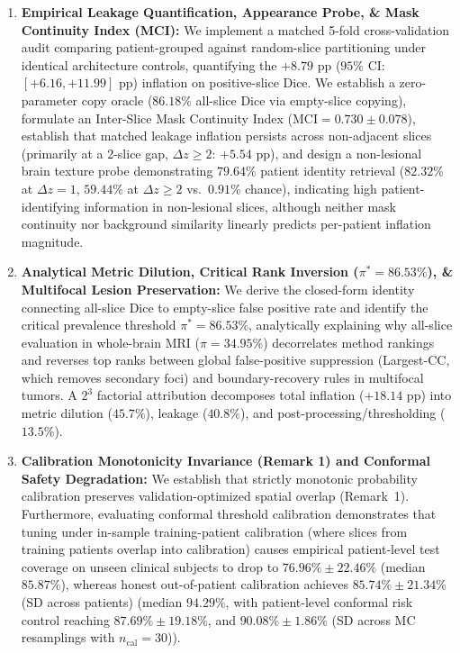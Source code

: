 \documentclass[11pt,a4paper]{article}
\begin{document}
\begin{enumerate}
    \item \textbf{Empirical Leakage Quantification, Appearance Probe, \& Mask Continuity Index (MCI):} We implement a matched 5-fold cross-validation audit comparing patient-grouped against random-slice partitioning under identical architecture controls, quantifying the $+8.79\text{ pp}$ ($95\%$ CI: $[+6.16, +11.99]\text{ pp}$) inflation on positive-slice Dice. We establish a zero-parameter copy oracle ($86.18\%$ all-slice Dice via empty-slice copying), formulate an Inter-Slice Mask Continuity Index ($\text{MCI} = 0.730 \pm 0.078$), establish that matched leakage inflation persists across non-adjacent slices (primarily at a 2-slice gap, $\Delta z \ge 2$: $+5.54\text{ pp}$), and design a non-lesional brain texture probe demonstrating $79.64\%$ patient identity retrieval ($82.32\%$ at $\Delta z = 1$, $59.44\%$ at $\Delta z \ge 2$ vs.\ $0.91\%$ chance), indicating high patient-identifying information in non-lesional slices, although neither mask continuity nor background similarity linearly predicts per-patient inflation magnitude.
    \item \textbf{Analytical Metric Dilution, Critical Rank Inversion ($\pi^* = 86.53\%$), \& Multifocal Lesion Preservation:} We derive the closed-form identity connecting all-slice Dice to empty-slice false positive rate and identify the critical prevalence threshold $\pi^* = 86.53\%$, analytically explaining why all-slice evaluation in whole-brain MRI ($\pi = 34.95\%$) decorrelates method rankings and reverses top ranks between global false-positive suppression (Largest-CC, which removes secondary foci) and boundary-recovery rules in multifocal tumors. A $2^3$ factorial attribution decomposes total inflation ($+18.14\text{ pp}$) into metric dilution ($45.7\%$), leakage ($40.8\%$), and post-processing/thresholding ($13.5\%$).
    \item \textbf{Calibration Monotonicity Invariance (Remark 1) and Conformal Safety Degradation:} We establish that strictly monotonic probability calibration preserves validation-optimized spatial overlap (Remark~1). Furthermore, evaluating conformal threshold calibration demonstrates that tuning under in-sample training-patient calibration (where slices from training patients overlap into calibration) causes empirical patient-level test coverage on unseen clinical subjects to drop to $76.96\% \pm 22.46\%$ (median $85.87\%$), whereas honest out-of-patient calibration achieves $85.74\% \pm 21.34\%$ (SD across patients) (median $94.29\%$, with patient-level conformal risk control reaching $87.69\% \pm 19.18\%$, and $90.08\% \pm 1.86\%$ (SD across MC resamplings with $n_{\text{cal}} = 30$)).

\end{enumerate}
\end{document}
